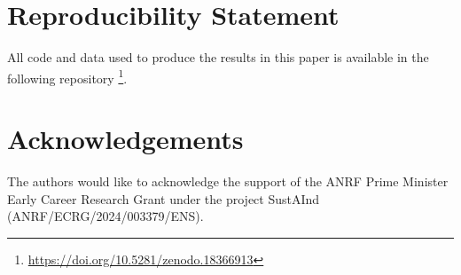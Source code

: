 \documentclass[sigconf]{acmart}
\begin{document}

  
\begin{abstract}

\end{abstract}
\maketitle

\newenvironment{bluepar}{\color{blue}}{}









% 
% 

\section{Reproducibility Statement}
\label{sec:reproducibility}
All code and data used to produce the results in this paper is available in the following repository \footnote{\url{https://doi.org/10.5281/zenodo.18366913}}.
\section {Acknowledgements}
The authors would like to acknowledge the support of the ANRF Prime Minister Early Career Research Grant under the project SustAInd (ANRF/ECRG/2024/003379/ENS).








\end{document}
